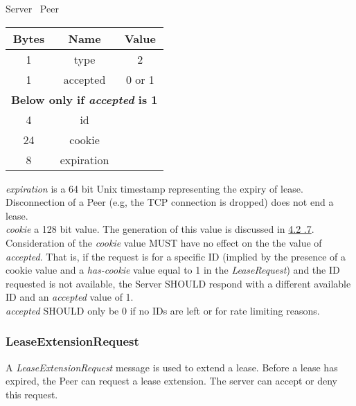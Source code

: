 \documentclass{article}
\begin{document}
    \begin{center}
        Server \textrightarrow\ Peer\\
        \begin{tabular}{|c|c|c|}
            \hline
            \textbf{Bytes} & \textbf{Name} & \textbf{Value} \\
            \hline
            1              & type          & 2              \\
            \hline
            1              & accepted      & 0 or 1         \\
            \hline
            \multicolumn{3}{|c|}{\textbf{Below only if \emph{accepted} is 1} } \\
            \hline
            4              & id            &                \\
            \hline
            24             & cookie        &                \\
            \hline
            8              & expiration    &                \\
            \hline
        \end{tabular}
    \end{center}

    \emph{expiration} is a 64 bit Unix timestamp representing the expiry of lease. Disconnection of a Peer (e.g,
    the TCP connection is dropped) does not end a lease.\\

    \emph{cookie} a 128 bit value. The generation of this value is discussed in \hyperlink{subsubsection.4.2.7}{4.2
    .7}.\\

    Consideration of the \emph{cookie} value MUST have no effect on the the value of \emph{accepted}. That is, if the
    request is for a specific ID (implied by the presence of a cookie value and a \emph{has-cookie} value equal to 1
    in the \emph{LeaseRequest}) and the ID requested is not available, the Server SHOULD respond with a different
    available ID and an \emph{accepted} value of 1.\\

    \emph{accepted} SHOULD only be 0 if no IDs are left or for rate limiting reasons.

    \subsubsection{LeaseExtensionRequest}

    A \emph{LeaseExtensionRequest} message is used to extend a lease. Before a lease has expired, the Peer can
    request a lease extension. The server can accept or deny this request.
\end{document}

